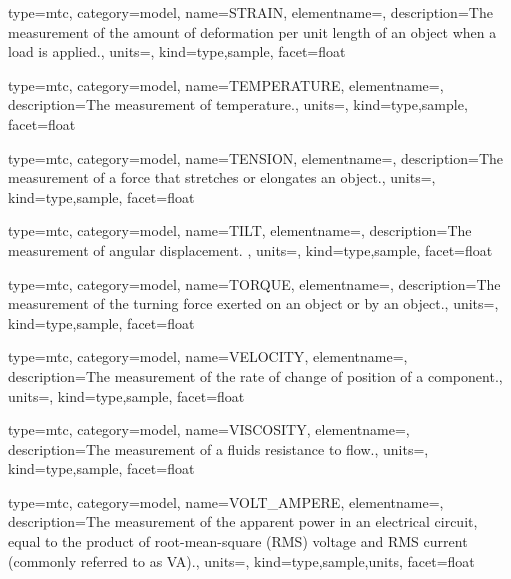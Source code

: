 {
  type=mtc,
  category=model,
  name={STRAIN},
  elementname=,
  description={The measurement of the amount of deformation per unit length of an object when a load is applied.},
  units=,
  kind={type,sample},
  facet={\gls{float}}
}


{
  type=mtc,
  category=model,
  name={TEMPERATURE},
  elementname=,
  description={The measurement of temperature.},
  units=,
  kind={type,sample},
  facet={\gls{float}}
}


{
  type=mtc,
  category=model,
  name={TENSION},
  elementname=,
  description={The measurement of a force that stretches or elongates an object.},
  units=,
  kind={type,sample},
  facet={\gls{float}}
}


{
  type=mtc,
  category=model,
  name={TILT},
  elementname=,
  description={The measurement of angular displacement. },
  units=,
  kind={type,sample},
  facet={\gls{float}}
}


{
  type=mtc,
  category=model,
  name={TORQUE},
  elementname=,
  description={The measurement of the turning force exerted on an object or by an object.},
  units=,
  kind={type,sample},
  facet={\gls{float}}
}


{
  type=mtc,
  category=model,
  name={VELOCITY},
  elementname=,
  description={The measurement of the rate of change of position of a \gls{component}.},
  units=,
  kind={type,sample},
  facet={\gls{float}}
}


{
  type=mtc,
  category=model,
  name={VISCOSITY},
  elementname=,
  description={The measurement of a fluids resistance to flow.},
  units=,
  kind={type,sample},
  facet={\gls{float}}
}


{
  type=mtc,
  category=model,
  name={VOLT\_AMPERE},
  elementname=,
  description={The measurement of the apparent power in an electrical circuit, equal to the product of root-mean-square (RMS) voltage and RMS current (commonly referred to as VA).},
  units=,
  kind={type,sample,units},
  facet={\gls{float}}
}


